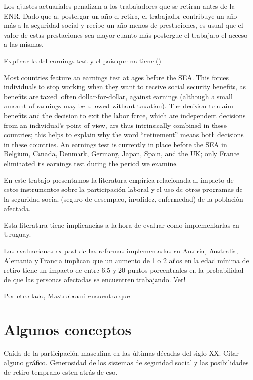 \documentclass[]{article}
\begin{document}
Los ajustes actuariales penalizan a los trabajadores que se retiran
antes de la ENR. Dado que al postergar un año el retiro, el trabajador
contribuye un año más a la seguridad social y recibe un año menos de
prestaciones, es usual que el valor de estas prestaciones sea mayor
cuanto más postergue el trabajaro el acceso a las mismas.

Explicar lo del earnings test y el país que no tiene ()

Most countries feature an earnings test at ages before the SEA. This
forces individuals to stop working when they want to receive social
security benefits, as benefits are taxed, often dollar-for-dollar,
against earnings (although a small amount of earnings may be allowed
without taxation). The decision to claim benefits and the decision to
exit the labor force, which are independent decisions from an
individual's point of view, are thus intrinsically combined in these
countries; this helps to explain why the word ``retirement'' means both
decisions in these countries. An earnings test is currently in place
before the SEA in Belgium, Canada, Denmark, Germany, Japan, Spain, and
the UK; only France eliminated its earnings test during the period we
examine.

En este trabajo presentamos la literatura empírica relacionada al
impacto de estos instrumentos sobre la participación laboral y el uso de
otros programas de la seguridad social (seguro de desempleo, invalidez,
enfermedad) de la población afectada.

Esta literatura tiene implicancias a la hora de evaluar como
implementarlas en Uruguay.

Las evaluaciones ex-post de las reformas implementadas en Austria,
Australia, Alemania y Francia implican que un aumento de 1 o 2 años en
la edad mínima de retiro tiene un impacto de entre 6.5 y 20 puntos
porcentuales en la probabilidad de que las personas afectadas se
encuentren trabajando. Ver!

Por otro lado, Mastrobouni encuentra que

\hypertarget{algunos-conceptos}{%
\section{Algunos conceptos}\label{algunos-conceptos}}

Caída de la participación masculina en las últimas décadas del siglo XX.
Citar alguno gráfico. Generosidad de los sistemas de seguridad social y
las posibilidades de retiro temprano esten atrás de eso.
\end{document}
